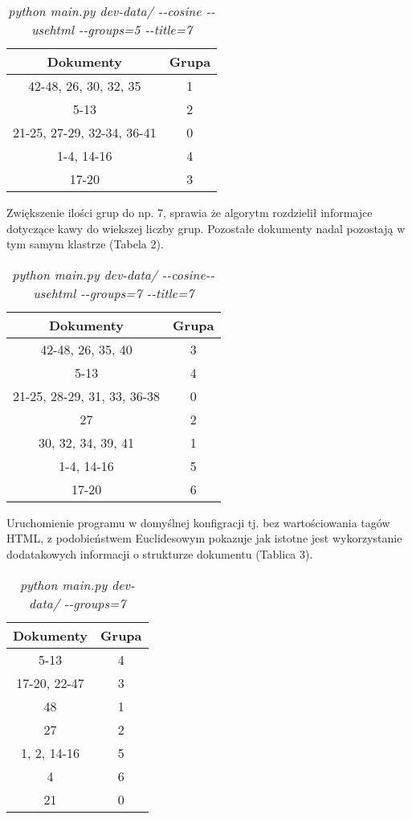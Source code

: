 \documentclass{article}
\begin{document}
\begin{table}[h]
\begin{center}
\begin{tabular}{ | c | c | }
\hline
Dokumenty & Grupa \\ \hline
42-48, 26, 30, 32, 35 & 1 \\ \hline
5-13 & 2 \\ \hline
21-25, 27-29, 32-34, 36-41 & 0 \\ \hline
1-4, 14-16 & 4 \\ \hline
17-20 & 3 \\ \hline
\end{tabular}
\end{center}
\caption{\emph{python main.py dev-data/ -{}-cosine -{}-usehtml -{}-groups=5  -{}-title=7}}
\end{table}

Zwiększenie ilości grup do np. 7, sprawia że algorytm rozdzielił informajce dotyczące kawy do wiekszej liczby grup. Pozostałe dokumenty nadal pozostają w tym samym klastrze (Tabela 2).

\begin{table}[h]
\begin{center}
\begin{tabular}{ | c | c | }
\hline
Dokumenty & Grupa \\ \hline
42-48, 26, 35, 40 & 3 \\ \hline
5-13 & 4 \\ \hline
21-25, 28-29, 31, 33, 36-38 & 0 \\ \hline
27 & 2 \\ \hline
30, 32, 34, 39, 41 & 1 \\ \hline
1-4, 14-16 & 5 \\ \hline
17-20 & 6 \\ \hline
\end{tabular}
\caption{\emph{python main.py dev-data/ -{}-cosine-{}-usehtml -{}-groups=7 -{}-title=7}}
\end{center}
\end{table}

Uruchomienie programu w domyślnej konfigracji tj. bez wartościowania tagów HTML, z podobieństwem Euclidesowym pokazuje jak istotne jest wykorzystanie dodatakowych informacji o strukturze dokumentu (Tablica 3). 

\begin{table}[h]
\begin{center}
\begin{tabular}{ | c | c | }
\hline
Dokumenty & Grupa \\ \hline
5-13 & 4 \\ \hline
17-20, 22-47 & 3 \\ \hline
48 & 1 \\ \hline
27 & 2 \\ \hline
1, 2, 14-16 & 5 \\ \hline
4 & 6 \\ \hline
21 & 0 \\ \hline
\end{tabular}
\caption{\emph{python main.py dev-data/ -{}-groups=7}}
\end{center}
\end{table}
\end{document}
